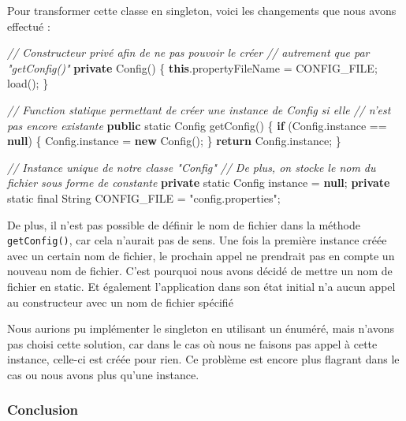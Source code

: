 \documentclass[french,]{article}
\newenvironment{Shaded}{}{}
\newcommand{\KeywordTok}[1]{\textcolor[rgb]{0.00,0.44,0.13}{\textbf{#1}}}
\newcommand{\DataTypeTok}[1]{\textcolor[rgb]{0.56,0.13,0.00}{#1}}
\newcommand{\StringTok}[1]{\textcolor[rgb]{0.25,0.44,0.63}{#1}}
\newcommand{\CommentTok}[1]{\textcolor[rgb]{0.38,0.63,0.69}{\textit{#1}}}
\newcommand{\FunctionTok}[1]{\textcolor[rgb]{0.02,0.16,0.49}{#1}}
\newcommand{\BuiltInTok}[1]{#1}
\newcommand{\NormalTok}[1]{#1}
\begin{document}
Pour transformer cette classe en singleton, voici les changements que
nous avons effectué :

\begin{Shaded}
\begin{Highlighting}[]
\CommentTok{// Constructeur privé afin de ne pas pouvoir le créer}
\CommentTok{// autrement que par "getConfig()"}
\KeywordTok{private} \FunctionTok{Config}\NormalTok{() \{}
   \KeywordTok{this}\NormalTok{.}\FunctionTok{propertyFileName}\NormalTok{ = CONFIG_FILE;}
   \FunctionTok{load}\NormalTok{();}
\NormalTok{\}}

\CommentTok{// Function statique permettant de créer une instance de Config si elle}
\CommentTok{// n'est pas encore existante}
\KeywordTok{public} \DataTypeTok{static}\NormalTok{ Config }\FunctionTok{getConfig}\NormalTok{() \{}
   \KeywordTok{if}\NormalTok{ (Config.}\FunctionTok{instance}\NormalTok{ == }\KeywordTok{null}\NormalTok{) \{}
\NormalTok{      Config.}\FunctionTok{instance}\NormalTok{ = }\KeywordTok{new} \FunctionTok{Config}\NormalTok{();}
\NormalTok{   \}}
   \KeywordTok{return}\NormalTok{ Config.}\FunctionTok{instance}\NormalTok{;}
\NormalTok{\}}

\CommentTok{// Instance unique de notre classe "Config"}
\CommentTok{// De plus, on stocke le nom du fichier sous forme de constante}
\KeywordTok{private} \DataTypeTok{static}\NormalTok{ Config instance = }\KeywordTok{null}\NormalTok{;}
\KeywordTok{private} \DataTypeTok{static} \DataTypeTok{final} \BuiltInTok{String}\NormalTok{ CONFIG_FILE = }\StringTok{"config.properties"}\NormalTok{;}
\end{Highlighting}
\end{Shaded}

De plus, il n'est pas possible de définir le nom de fichier dans la
méthode \texttt{getConfig()}, car cela n'aurait pas de sens. Une fois la
première instance créée avec un certain nom de fichier, le prochain
appel ne prendrait pas en compte un nouveau nom de fichier. C'est
pourquoi nous avons décidé de mettre un nom de fichier en static. Et
également l'application dans son état initial n'a aucun appel au
constructeur avec un nom de fichier spécifié

Nous aurions pu implémenter le singleton en utilisant un énuméré, mais
n'avons pas choisi cette solution, car dans le cas où nous ne faisons
pas appel à cette instance, celle-ci est créée pour rien. Ce problème
est encore plus flagrant dans le cas ou nous avons plus qu'une instance.

\subsubsection{Conclusion}\label{conclusion-1}
\end{document}
